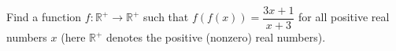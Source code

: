 Find a function $f : \mathbb{R}^+ \to \mathbb{R}^+$ such that $f(f(x)) =
\dfrac{3x + 1}{x + 3}$ for all positive real numbers $x$ (here $\mathbb{R}^+$
denotes the positive (nonzero) real numbers).
